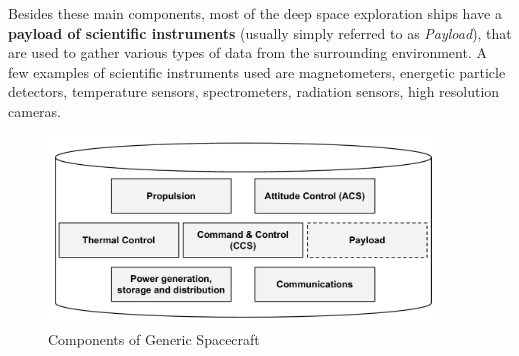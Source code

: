 Besides these main components, most of the deep space exploration ships have a
\textbf{payload of scientific instruments} (usually simply referred to as
\textit{Payload}), that are used to gather various types of data from the
surrounding environment. A few examples of scientific instruments used are
magnetometers, energetic particle detectors, temperature sensors, spectrometers,
radiation sensors, high resolution cameras.

\begin{figure}[htb]
	\begin{center}
	\includegraphics[width=0.92\textwidth]{img/generic_structure.pdf}
	\caption{Components of Generic Spacecraft}
	\label{fig:generic_structure}
	\end{center}
\end{figure}